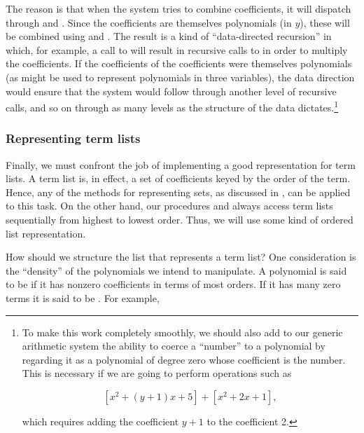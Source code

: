 The reason is that when the system tries to combine coefficients, it will
dispatch through  and .  Since the coefficients are
themselves polynomials (in \( y \)), these will be combined using 
and .  The result is a kind of ``data-directed recursion'' in
which, for example, a call to  will result in recursive calls to
 in order to multiply the coefficients.  If the coefficients of
the coefficients were themselves polynomials (as might be used to represent
polynomials in three variables), the data direction would ensure that the
system would follow through another level of recursive calls, and so on through
as many levels as the structure of the data dictates.\footnote{To make this
work completely smoothly, we should also add to our generic arithmetic system
the ability to coerce a ``number'' to a polynomial by regarding it as a
polynomial of degree zero whose coefficient is the number.  This is necessary
if we are going to perform operations such as
\begin{comment}

\begin{example}
[x^2 + (y + 1)x + 5] + [x^2 + 2x + 1]
\end{example}

\end{comment}

$$ [x^2 + (y + 1)x + 5] + [x^2 + 2x + 1], $$

\noindent
which requires adding the coefficient \( y + 1 \) to the coefficient 2.}

\subsubsection*{Representing term lists}

Finally, we must confront the job of implementing a good representation for
term lists.  A term list is, in effect, a set of coefficients keyed by the
order of the term.  Hence, any of the methods for representing sets, as
discussed in , can be applied to this task.  On the other
hand, our procedures  and  always access term
lists sequentially from highest to lowest order.  Thus, we will use some kind
of ordered list representation.

How should we structure the list that represents a term list?  One
consideration is the ``density'' of the polynomials we intend to manipulate.  A
polynomial is said to be  if it has nonzero coefficients in
terms of most orders.  If it has many zero terms it is said to be
.  For example,
\begin{comment}

\begin{example}
A : x^5 + 2x^4 + 3x^2 - 2x - 5
\end{example}

\end{comment}

